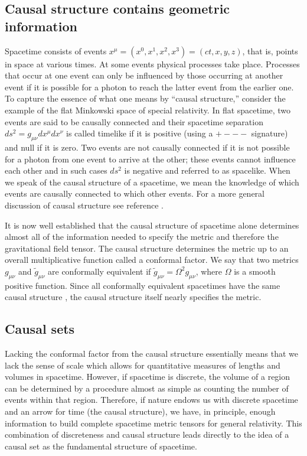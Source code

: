 \documentclass[aps,amssymb,12pt]{revtex4-2}
\begin{document}
\subsection{Causal structure contains geometric information}

Spacetime consists of events $x^{\mu {}}=(x^0,x^1,x^2,x^3)=(ct,x,y,z)$, that
is, points in space at various times. At some events physical processes take
place. Processes that occur at one event can only be influenced by those
occurring at another event if it is possible for a photon to reach the
latter event from the earlier one. To capture the essence of what one means
by ``causal structure,'' consider the example of the flat Minkowski space of
special relativity. In flat spacetime, two events are said to be causally
connected and their spacetime separation $ds^2=g_{\mu \nu }dx^{\mu
{}}dx^{\nu {}}$ is called timelike if it is positive (using a $+---$
signature) and null if it is zero. Two events are not causally connected if
it is not possible for a photon from one event to arrive at the other; these
events cannot influence each other and in such cases $ds^2$ is negative and
referred to as spacelike. When we speak of the causal structure of a
spacetime, we mean the knowledge of which events are causally connected to
which other events. For a more general discussion of causal structure see
reference \cite{16}.

It is now well established that the causal structure of spacetime alone
determines almost all of the information needed to specify the metric \cite{17,
18} and therefore the gravitational field tensor. The causal structure
determines the metric up to an overall multiplicative function called a
conformal factor. We say that two metrics $g_{\mu \nu }$ and $\widetilde{g}%
_{\mu \nu }$ are conformally equivalent if $\widetilde{g}_{\mu \nu }=\Omega
^2g_{\mu \nu }$, where $\Omega $ is a smooth positive function. Since all
conformally equivalent spacetimes have the same causal structure \cite{19}, the
causal structure itself nearly specifies the metric.

\subsection{Causal sets}

Lacking the conformal factor from the causal structure essentially means
that we lack the sense of scale which allows for quantitative measures of
lengths and volumes in spacetime. However, if spacetime is discrete, the
volume of a region can be determined by a procedure almost as simple as
counting the number of events within that region. Therefore, if nature
endows us with discrete spacetime and an arrow for time (the causal
structure), we have, in principle, enough information to build complete
spacetime metric tensors for general relativity. This combination of
discreteness and causal structure leads directly to the idea of a causal set
as the fundamental structure of spacetime.
\end{document}
